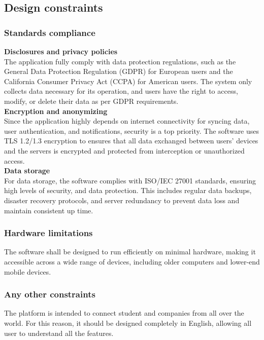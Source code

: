 \documentclass[11pt,twoside]{article}
\begin{document}
	\subsection{Design constraints}	
		\subsubsection{Standards compliance}
\textbf{Disclosures and privacy policies} \\
The application fully comply with data protection regulations, such as the General Data Protection Regulation (GDPR) for European users and the California Consumer Privacy Act (CCPA) for American users. The system only collects data necessary for its operation, and users have the right to access, modify, or delete their data as per GDPR requirements.
\vspace{1\baselineskip}\\
\textbf{Encryption and anonymizing} \\
Since the application highly depends on internet connectivity for syncing data, user authentication, and notifications, security is a top priority. The software uses TLS 1.2/1.3 encryption to ensures that all data exchanged between users’ devices and the servers is encrypted and protected from interception or unauthorized access.
\vspace{1\baselineskip}\\
\textbf{Data storage} \\
For data storage, the software complies with ISO/IEC 27001 standards, ensuring high levels of security, and data protection. This includes regular data backups, disaster recovery protocols, and server redundancy to prevent data loss and maintain consistent up time.
		
		\subsubsection{Hardware limitations}
The software shall be designed to run efficiently on minimal hardware, making it accessible across a wide range of devices, including older computers and lower-end mobile devices.
		
		\subsubsection{Any other constraints}
The platform is intended to connect student and companies from all over the world. For this reason, it should be designed completely in English, allowing all user to understand all the features.
		
\end{document}
